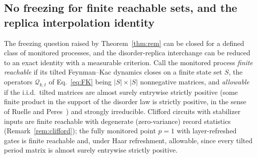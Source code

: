 
\subsection{No freezing for finite reachable sets, and the replica interpolation identity}
\label{sec:nofreeze}

The freezing question raised by Theorem~\ref{thm:rem} can be closed for a
defined class of monitored processes, and the disorder-replica interchange
can be reduced to an exact identity with a measurable criterion.  Call the
monitored process \emph{finite reachable} if its tilted Feynman--Kac
dynamics closes on a finite state set $S$, the operators
$\mathcal Q_{k,t}$ of Eq.~\eqref{eq:FK} being $|S|\times|S|$ nonnegative
matrices, and \emph{allowable} if the i.i.d.\ tilted matrices are almost
surely entrywise strictly positive (some finite product in the support of
the disorder law is strictly positive, in the sense of Ruelle and
Peres~\cite{Ruelle1979,Peres1992}) and strongly irreducible.  Clifford
circuits with stabilizer inputs are finite reachable with degenerate
(zero-variance) record statistics (Remark~\ref{rem:clifford}); the fully
monitored point $p=1$ with layer-refreshed gates is finite reachable and,
under Haar refreshment, allowable, since every tilted period matrix is
almost surely entrywise strictly positive.

